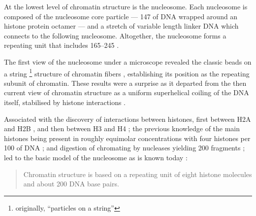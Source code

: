     At the lowest level of chromatin structure is the nucleosome.
    Each nucleosome is composed of the nucleosome core particle ---
    \SI{147}{\bp} of DNA wrapped around
    an histone protein octamer ---
    and a stretch of variable length linker DNA which connects
    to the following nucleosome.  Altogether, the nucleosome forms
    a repeating unit that includes \SIrange{165}{245}{\bp}
    \citep{widom1992-linker-length}.

    The first view of the nucleosome under a microscope revealed the
    classic beads on a string \footnote{originally, ``particles on a string''}
    structure of chromatin fibers
     \citep{olin1974-nu-bodies},
    establishing its position as the repeating subunit of chromatin.
    These results were a surprise as it departed from the then current view
    of chromatin structure as a uniform superhelical coiling of the
    DNA itself, stabilised by histone interactions
    \citep{pardon-wilkins-1972model}.

    Associated with the discovery of interactions between histones,
    first between H2A and H2B \citep{anna-isenberg-1974-h2a-h2b}, and
    then between H3 and H4 \citep{kornberg1974-results};
    the previous knowledge of the main histones being present in
    roughly equimolar concentrations with four histones per
    \SI{100}{\bp} of DNA ;
    and digestion of chromating by nucleases yielding
    \SI{200}{\bp} fragments \citep{hewish1973-200bp-pieces};
    led to the basic model of the nucleosome as is known today
    :

    \begin{quotation}
      Chromatin structure is based on a repeating unit of eight
      histone molecules and about 200 DNA base pairs.
    \end{quotation}

